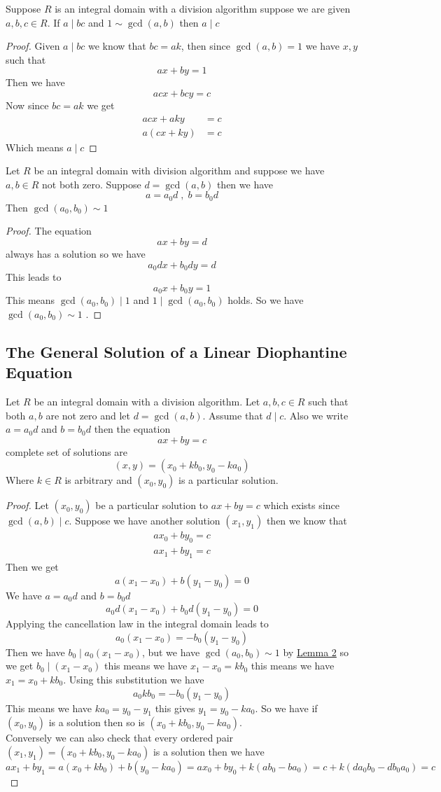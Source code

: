 \documentclass[16pt,a4paper]{article}
\theoremstyle{definition}
\begin{document}
\begin{thm}{}{}
Suppose $R$ is an integral domain with a division algorithm suppose we are given $a,b,c\in R$. If $a\mid bc$ and $1\sim \gcd(a,b)$ then $a\mid c$
\end{thm}
\begin{proof}
Given $a\mid bc$ we know that $bc=ak$, then since $\gcd(a,b) = 1$ we have $x,y$ such that 
\[ax+by = 1\]
Then we have 
\[acx+bcy=c\]
Now since $bc = ak$ we get
\begin{align*}
acx+aky &= c\\
a(cx+ky) & = c
\end{align*}
Which means $a\mid c$
\end{proof}
\begin{lemm}{}{}\label{lemm2}
Let $R$ be an integral domain with division algorithm and suppose we have $a,b\in R$ not both zero. Suppose $d=\gcd(a,b)$ then we have 
\[a=a_0d \;,\; b=b_0d\]
Then $\gcd(a_0,b_0) \sim 1$  
\end{lemm}
\begin{proof}
The equation 
\[ax+by = d\]
always has a solution so we have
\[a_0dx+b_0dy = d\]
This leads to 
\[a_0x+b_0y = 1\]
This means $\gcd(a_0,b_0)\mid 1$ and $1\mid \gcd(a_0,b_0)$ holds. So we have $\gcd(a_0,b_0) \sim 1$ .  
\end{proof}
\newpage
\subsection{The General Solution of a Linear Diophantine Equation}
\begin{thm}{}{}
Let $R$ be an integral domain with a division algorithm. Let $a,b,c\in R$ such that both $a,b$ are not zero and let $d=\gcd(a,b)$. Assume that $d\mid c$. Also we write $a=a_0d$ and $b=b_0d$ then the equation 
\[ax+by=c\]
complete set of solutions are
\[(x,y) = (x_0+kb_0,y_0-ka_0)\]
Where $k\in R$ is arbitrary and $(x_0,y_0)$ is a particular solution.    
\end{thm}
\begin{proof}
Let $(x_0,y_0)$ be a particular solution to $ax+by=c$ which exists since $\gcd(a,b)\mid c$. Suppose we have another solution $(x_1,y_1)$ then we know that 
\begin{align*}
ax_0+by_0 = c \\
ax_1+by_1 = c
\end{align*}
Then we get 
\[a(x_1-x_0)+b(y_1-y_0) = 0\]
We have $a=a_0d$ and $b=b_0d$ 
\[a_0d(x_1-x_0)+b_0d(y_1-y_0) = 0\]
Applying the cancellation law in the integral domain leads to 
\[a_0(x_1-x_0)=-b_0(y_1-y_0) \]
Then we have $b_0\mid a_0(x_1-x_0)$, but we have $\gcd(a_0,b_0)\sim 1$ by \hyperref[lemm2]{Lemma 2} so we get $b_0\mid (x_1-x_0)$ this means we have 
$x_1-x_0 = kb_0$ this means we have $x_1 = x_0 + kb_0$. Using this substitution we have 
\[a_0kb_0 = -b_0(y_1-y_0)\]
This means we have $ka_0 = y_0 - y_1$  this gives $y_1 = y_0-ka_0$. So we have if $(x_0,y_0)$ is a solution then so is $(x_0+kb_0,y_0-ka_0)$. 
\\
Conversely we can also check that every ordered pair $(x_1,y_1)=(x_0+kb_0,y_0-ka_0)$ is a solution then we have 
\[ax_1+by_1=a(x_0+kb_0)+b(y_0-ka_0) = ax_0+by_0+k(ab_0-ba_0) = c+k(da_0b_0 -db_0a_0) = c\] 
\end{proof}
\end{document}
